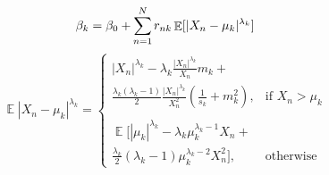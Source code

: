 \documentclass[conference]{IEEEtran}
\begin{document}
    \begin{equation}\label{betak}
        \beta_k = \beta_0 + \sum_{\mathclap{n=1}}^{N} r_{nk} \mathop{\mathbb{E}}[|X_n - \mu_k|^{\lambda_k}]
    \end{equation}
     \[
        \mathop{\mathbb{E}}|X_n - \mu_k|^{\lambda_k}=
    \begin{cases}
         |X_n|^{\lambda_k} - \lambda_k \frac{|X_n|^{\lambda_k}}{X_n} m_k + \\
            \frac{\lambda_k(\lambda_k - 1)}{2} \frac{|X_n|^{\lambda_k}}{X_n^2}(\frac{1}{s_k} + m_k^2)     ,& \text{if } X_n > \mu_k\\ \\
            \mathop{\mathbb{E}}[|\mu_k|^{\lambda_k} - \lambda_k \mu_k^{\lambda_k - 1} X_n + \\ 
            \frac{\lambda_k}{2} (\lambda_k - 1) \mu_k^{\lambda_k - 2} X_n^2],              & \text{otherwise}
        \end{cases}
    \]
    

    
    
\end{document}
